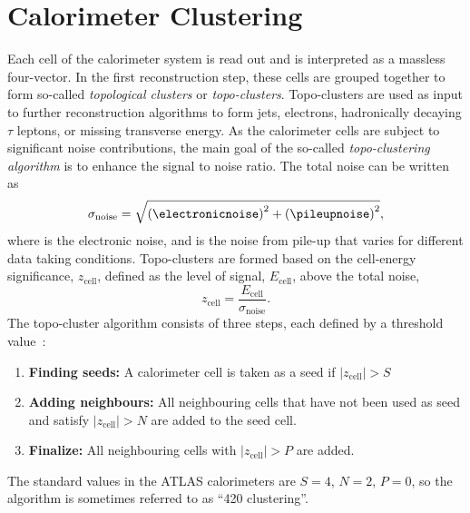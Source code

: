 \section{Calorimeter Clustering}
Each cell of the calorimeter system is read out and is interpreted as a massless four-vector. In the first reconstruction step, these cells are grouped together to form so-called \emph{topological clusters} or \emph{topo-clusters}. Topo-clusters are used as input to further reconstruction algorithms to form jets, electrons, hadronically decaying $\tau$ leptons, or missing transverse energy.
As the calorimeter cells are subject to significant noise contributions, the main goal of the so-called \emph{topo-clustering algorithm} is to enhance the signal to noise ratio. The total noise can be written as
\begin{equation}
    \sigma_{\text{noise}} = \sqrt{ \left( \electronicnoise  \right)^2  + \left( \pileupnoise  \right)^2 },
\end{equation}
where \electronicnoise is the electronic noise, and \pileupnoise is the noise from pile-up that varies for different data taking conditions.
Topo-clusters are formed based on the cell-energy significance, $z_{\text{cell}}$, defined as the level of signal, $E_{\text{cell}}$, above the total noise,
\begin{equation}
    z_{\text{cell}} = \frac{E_{\text{cell}}}{\sigma_{\text{noise}}}.
\end{equation}
The topo-cluster algorithm consists of three steps, each defined by a threshold value~\cite{PERF-2014-07}:
\begin{enumerate}
    \item \textbf{Finding seeds:} A calorimeter cell is taken as a seed if $|z_{\text{cell}}| > S$
    \item \textbf{Adding neighbours:} All neighbouring cells that have not been used as seed and satisfy $|z_{\text{cell}}| > N$ are added to the seed cell.
    \item \textbf{Finalize: } All neighbouring cells with $|z_{\text{cell}}| > P$ are added.
\end{enumerate}
The standard values in the ATLAS calorimeters are $S = 4$, $N = 2$, $P = 0$, so the algorithm is sometimes referred to as ``420 clustering''.

